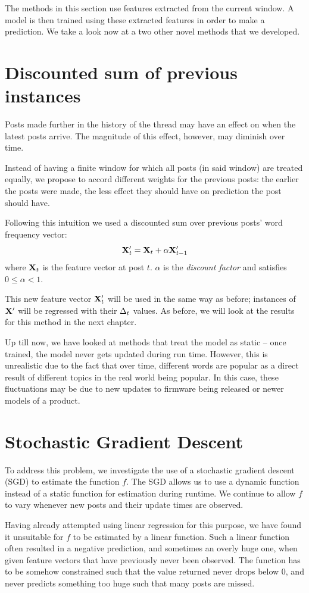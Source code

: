 The methods in this section use features extracted from the current window. A 
model is then trained using these extracted features in order to make a 
prediction. We take a look now at a two other novel methods that we developed.

\section{Discounted sum of previous instances}
 
Posts made further in the history of the thread may have an effect on when the 
latest posts arrive. The magnitude of this effect, however, may diminish over 
time.

Instead of having a finite window for which all posts (in said window) are 
treated equally, we propose to accord different weights for the previous posts: the earlier the posts were made, the less effect they should have on prediction 
the post should have.

Following this intuition we used a discounted sum over previous posts' word 
frequency vector:
\[
	\mathbf{X}'_t = \mathbf{X}_t + \alpha \mathbf{X}'_{t-1}
\]
where $\mathbf{X}_t$ is the feature vector at post $t$. $\alpha$ is the \emph{discount 
factor} and satisfies $0 \leq \alpha < 1$.

This new feature vector $\mathbf{X}'_t$ will be used in the same way as before; 
instances of $\mathbf{X}'$ will be regressed with their $\Delta_t$ values. As before, we will 
look at the results for this method in the next chapter.

Up till now, we have looked at methods that treat the model as static -- once 
trained, the model never gets updated during run time. However, this is 
unrealistic due to the fact that over time, different words are popular as a 
direct result of different topics in the real world being popular. In this case, 
these fluctuations may be due to new updates to firmware being released or newer 
models of a product.

\section{Stochastic Gradient Descent}
To address this problem, we investigate the use of a stochastic gradient descent (SGD) to estimate the function $f$.  The SGD allows us to use a dynamic function instead of a static function for estimation 
during runtime.  We continue to allow $f$ to 
vary whenever new posts and their update times are observed.

Having already attempted using linear regression for this purpose, we have found 
it unsuitable for $f$ to be estimated by a linear function. Such a linear 
function often resulted in a negative prediction, and sometimes an 
overly huge one, when given feature vectors that have previously never been 
observed. The function has to be somehow constrained such that the value 
returned never drops below 0, and never predicts something too huge such that 
many posts are missed.

